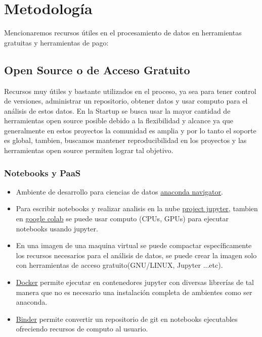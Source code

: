 \documentclass[12pt,a4paper,openright]{article}
\begin{document}

\section{Metodolog\'ia}
Mencionaremos recursos \'utiles en el procesamiento de datos en herramientas gratuitas y herramientas de pago:
\subsection{Open Source o de Acceso Gratuito}
Recursos muy útiles y bastante utilizados en el proceso, ya sea para tener control de versiones, administrar un repositorio, obtener datos y usar computo para el análisis de estos datos. En la Startup se busca usar la mayor cantidad de herramientas open source posible debido a la flexibilidad y alcance ya que generalmente en estos proyectos la comunidad es amplia y por lo tanto el soporte es global, tambien, buscamos mantener reproducibilidad en los proyectos y las herramientas open source permiten lograr tal objetivo.

\subsubsection{Notebooks y PaaS}

\begin{itemize}
    \item Ambiente de desarrollo para ciencias de datos \href{https://www.anaconda.com/}{anaconda navigator}.
    \item Para escribir notebooks y realizar analisis en la nube \href{https://jupyter.org/}{project jupyter}, tambien en \href{https://colab.research.google.com/notebooks/intro.ipynb?utm_source=scs-index}{google colab} se puede usar computo (CPUs, GPUs) para ejecutar notebooks usando jupyter.
    \item En una imagen de una maquina virtual se puede compactar específicamente los recursos necesarios para el análisis de datos, se puede crear la imagen solo con herramientas de acceso gratuito(GNU/LINUX, Jupyter ...etc).
    \item \href{https://hub.docker.com/}{Docker} permite ejecutar en contenedores jupyter con diversas librerías de tal manera que no es necesario una instalación completa de ambientes como ser anaconda.
    \item \href{https://mybinder.org/}{Binder} permite convertir un repositorio de git en notebooks ejecutables ofreciendo recursos de computo al usuario.
    
\end{itemize}
\end{document}

